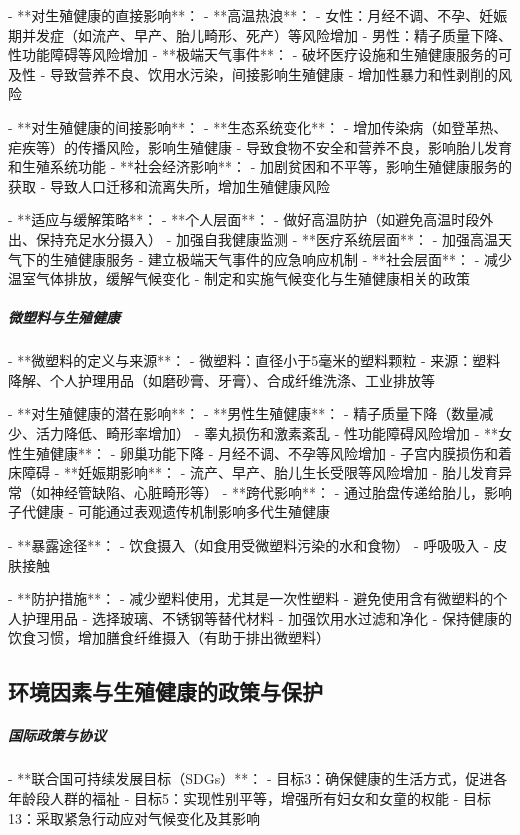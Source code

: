 \begin{enumerate}
- **对生殖健康的直接影响**：
  - **高温热浪**：
    - 女性：月经不调、不孕、妊娠期并发症（如流产、早产、胎儿畸形、死产）等风险增加
    - 男性：精子质量下降、性功能障碍等风险增加
  - **极端天气事件**：
    - 破坏医疗设施和生殖健康服务的可及性
    - 导致营养不良、饮用水污染，间接影响生殖健康
    - 增加性暴力和性剥削的风险

- **对生殖健康的间接影响**：
  - **生态系统变化**：
    - 增加传染病（如登革热、疟疾等）的传播风险，影响生殖健康
    - 导致食物不安全和营养不良，影响胎儿发育和生殖系统功能
  - **社会经济影响**：
    - 加剧贫困和不平等，影响生殖健康服务的获取
    - 导致人口迁移和流离失所，增加生殖健康风险

- **适应与缓解策略**：
  - **个人层面**：
    - 做好高温防护（如避免高温时段外出、保持充足水分摄入）
    - 加强自我健康监测
  - **医疗系统层面**：
    - 加强高温天气下的生殖健康服务
    - 建立极端天气事件的应急响应机制
  - **社会层面**：
    - 减少温室气体排放，缓解气候变化
    - 制定和实施气候变化与生殖健康相关的政策

\subparagraph{微塑料与生殖健康}

- **微塑料的定义与来源**：
  - 微塑料：直径小于5毫米的塑料颗粒
  - 来源：塑料降解、个人护理用品（如磨砂膏、牙膏）、合成纤维洗涤、工业排放等

- **对生殖健康的潜在影响**：
  - **男性生殖健康**：
    - 精子质量下降（数量减少、活力降低、畸形率增加）
    - 睾丸损伤和激素紊乱
    - 性功能障碍风险增加
  - **女性生殖健康**：
    - 卵巢功能下降
    - 月经不调、不孕等风险增加
    - 子宫内膜损伤和着床障碍
  - **妊娠期影响**：
    - 流产、早产、胎儿生长受限等风险增加
    - 胎儿发育异常（如神经管缺陷、心脏畸形等）
  - **跨代影响**：
    - 通过胎盘传递给胎儿，影响子代健康
    - 可能通过表观遗传机制影响多代生殖健康

- **暴露途径**：
  - 饮食摄入（如食用受微塑料污染的水和食物）
  - 呼吸吸入
  - 皮肤接触

- **防护措施**：
  - 减少塑料使用，尤其是一次性塑料
  - 避免使用含有微塑料的个人护理用品
  - 选择玻璃、不锈钢等替代材料
  - 加强饮用水过滤和净化
  - 保持健康的饮食习惯，增加膳食纤维摄入（有助于排出微塑料）

\subsection{环境因素与生殖健康的政策与保护}

\subparagraph{国际政策与协议}

- **联合国可持续发展目标（SDGs）**：
  - 目标3：确保健康的生活方式，促进各年龄段人群的福祉
  - 目标5：实现性别平等，增强所有妇女和女童的权能
  - 目标13：采取紧急行动应对气候变化及其影响


\end{enumerate}

